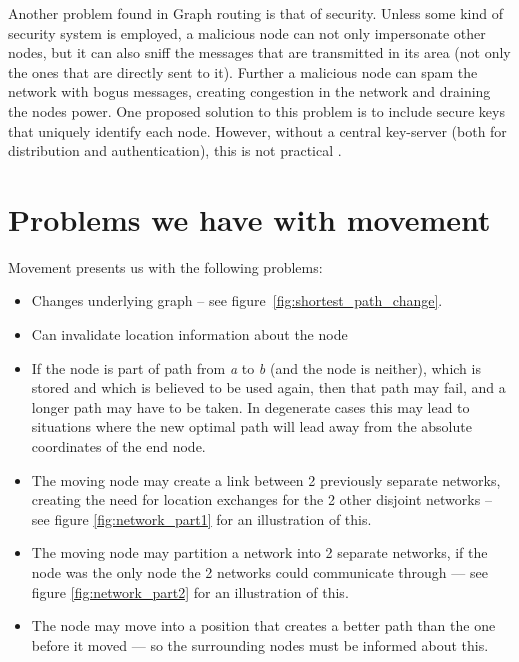 Another problem found in Graph routing is that of security. Unless some kind of security system is employed, a malicious node can not only impersonate other nodes, but it can also sniff the messages that are transmitted in its area (not only the ones that are directly sent to it). Further a malicious node can spam the network with bogus messages, creating congestion in the network and draining the nodes power. One proposed solution to this problem is to include secure keys that uniquely identify each node. However, without a central key-server (both for distribution and authentication), this is not practical \cite{trustedRouting}.

\section{Problems we have with movement}


Movement presents us with the following problems:


\begin{itemize}
\item Changes underlying graph -- see figure~\ref{fig:shortest_path_change}.
\item Can invalidate location information about the node 
\item If the node is part of path from \emph{a} to \emph{b} (and the node is neither), which is stored and which is believed to be used again, then that path may fail, and a longer path may have to be taken. In degenerate cases this may lead to situations where the new optimal path will lead away from the absolute coordinates of the end node.
\item The moving node may create a link between 2 previously separate networks, creating the need for location exchanges for the 2 other disjoint networks -- see figure \ref{fig:network_part1} for an illustration of this.
\item The moving node may partition a network into 2 separate networks, if the node was the only node the 2 networks could communicate through --- see figure \ref{fig:network_part2} for an illustration of this.
\item The node may move into a position that creates a better path than the one before it moved --- so the surrounding nodes must be informed about this.
\end{itemize}

